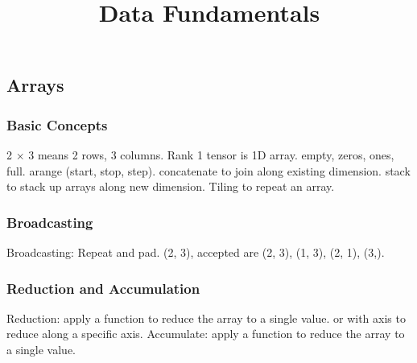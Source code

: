 \documentclass{article}
\title{Data Fundamentals}
\author{}
\date{}
\begin{document}
\small

\subsection*{Arrays}

\subsubsection*{Basic Concepts}
2 $\times$ 3 means 2 rows, 3 columns.  
Rank 1 tensor is 1D array.  
empty, zeros, ones, full.  
arange (start, stop, step).  
concatenate to join along existing dimension.  
stack to stack up arrays along new dimension.  
Tiling to repeat an array.  

\subsubsection*{Broadcasting}
Broadcasting:  
Repeat and pad.  
(2, 3), accepted are (2, 3), (1, 3), (2, 1), (3,).  

\subsubsection*{Reduction and Accumulation}
Reduction: apply a function to reduce the array to a single value.  
or with axis to reduce along a specific axis.  
Accumulate: apply a function to reduce the array to a single value.
\end{document}
